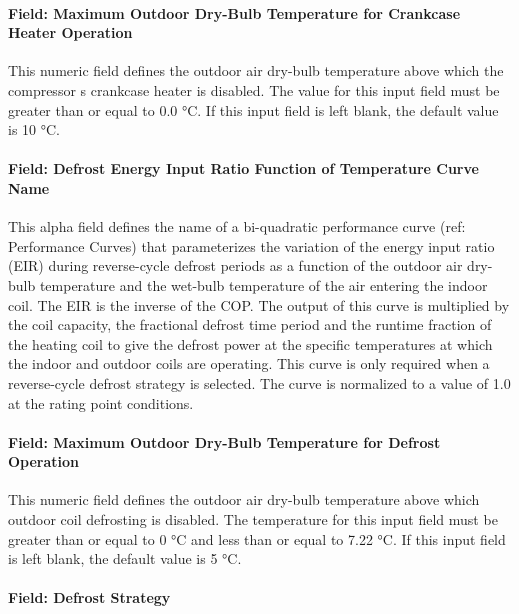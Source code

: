 \paragraph{Field: Maximum Outdoor Dry-Bulb Temperature for Crankcase Heater Operation}\label{field-maximum-outdoor-dry-bulb-temperature-for-crankcase-heater-operation-5}

This numeric field defines the outdoor air dry-bulb temperature above which the compressor s crankcase heater is disabled. The value for this input field must be greater than or equal to 0.0 °C. If this input field is left blank, the default value is 10 °C.

\paragraph{Field: Defrost Energy Input Ratio Function of Temperature Curve Name}\label{field-defrost-energy-input-ratio-function-of-temperature-curve-name-1}

This alpha field defines the name of a bi-quadratic performance curve (ref: Performance Curves) that parameterizes the variation of the energy input ratio (EIR) during reverse-cycle defrost periods as a function of the outdoor air dry-bulb temperature and the wet-bulb temperature of the air entering the indoor coil. The EIR is the inverse of the COP. The output of this curve is multiplied by the coil capacity, the fractional defrost time period and the runtime fraction of the heating coil to give the defrost power at the specific temperatures at which the indoor and outdoor coils are operating. This curve is only required when a reverse-cycle defrost strategy is selected. The curve is normalized to a value of 1.0 at the rating point conditions.

\paragraph{Field: Maximum Outdoor Dry-Bulb Temperature for Defrost Operation}\label{field-maximum-outdoor-dry-bulb-temperature-for-defrost-operation-1}

This numeric field defines the outdoor air dry-bulb temperature above which outdoor coil defrosting is disabled. The temperature for this input field must be greater than or equal to 0 °C and less than or equal to 7.22 °C. If this input field is left blank, the default value is 5 °C.

\paragraph{Field: Defrost Strategy}\label{field-defrost-strategy-1}

